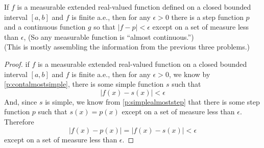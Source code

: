 \begin{pblm}%
	If $f$ is a measurable extended real-valued function defined on a closed 
	bounded interval $[a,b]$ and $f$ is finite a.e., then for any 
	$\epsilon > 0$ there is a step function $p$ and a continuous function $g$ 
	so that $|f-p|<\epsilon$ except on a set of measure less than $\epsilon$, 
	(So any measurable function is ``almost continuous.'')\\
	(This is mostly assembling the information from the previous three 
	problems.)
\begin{proof}
	if $f$ is a measurable extended real-valued function on a closed bounded 
	interval $[a,b]$ and $f$ is finite a.e., then for any $\epsilon > 0$, we
	know by \ref{p:contalmostsimple}, there is some simple function $s$ such that 
	\begin{equation*}
		|f(x) - s(x)| < \epsilon
	\end{equation*}
	And, since $s$ is simple, we know from \ref{p:simplealmoststep} that 
	there is some step function $p$ such that 
	$s(x) = p(x)$ except on a set of measure less than $\epsilon$. 
	Therefore 
	\begin{equation*}
		|f(x) - p(x)| = |f(x) - s(x)| < \epsilon
	\end{equation*}
	except on a set of measure less than $\epsilon$. 
\end{proof}
\end{pblm}

